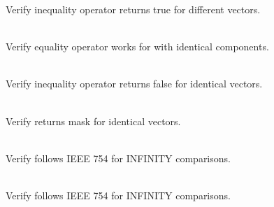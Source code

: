 \begin{DoxyRefList}
Verify  inequality operator returns true for different vectors.  
\item[{\parbox[t]{\linewidth}{Member \doxylink{group___f_g_m___vec4___inequality_ga2da819ca2eb9ba75aa97190618239f63}{Vector4\+DEquality\+\_\+\+Inequality\+Operator\+\_\+\+Identical\+Boolean\+Vectors\+Returns\+False} ()}}]\hfill \\
\label{test__test000096}%
%
Verify  equality operator works for  with identical components.  
\item[{\parbox[t]{\linewidth}{Member \doxylink{group___f_g_m___vec4___inequality_ga28123c6d3e174392e159466ab7e60593}{Vector4\+DEquality\+\_\+\+In\+Equality\+Operator\+\_\+\+Identical\+Vectors\+Returns\+False} ()}}]\hfill \\
\label{test__test000094}%
%
Verify  inequality operator returns false for identical vectors.  
\item[{\parbox[t]{\linewidth}{Member \doxylink{group___f_g_m___vec4___inequality_gad2d129e0321231fcf0398d63c80448b9}{Vector4\+DEquality\+\_\+\+Inequality\+Returns\+Correct\+Boolean\+Mask} ()}}]\hfill \\
\label{test__test000098}%
%
Verify  returns  mask for identical vectors.  
\item[{\parbox[t]{\linewidth}{Member \doxylink{group___f_g_m___vec4___equality_ga35862ef76dd67a2aeb2e445e88a3000d}{Vector4\+DEquality\+\_\+\+Infinity\+Equality\+\_\+\+Different\+Vectors\+Returns\+False} ()}}]\hfill \\
\label{test__test000073}%
%
Verify  follows IEEE 754 for INFINITY comparisons.  
\item[{\parbox[t]{\linewidth}{Member \doxylink{group___f_g_m___vec4___equality_ga9de7ccc75f989311b630c152b58ecef6}{Vector4\+DEquality\+\_\+\+Infinity\+Equality\+\_\+\+Identical\+Vectors\+Returns\+True} ()}}]\hfill \\
\label{test__test000072}%
%
Verify  follows IEEE 754 for INFINITY comparisons.  

\end{DoxyRefList}
